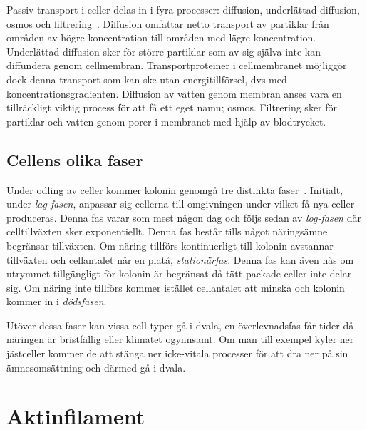 Passiv transport i celler delas in i fyra processer: diffusion, underlättad diffusion, osmos och filtrering~\cite{Cram_Passivetransport}. Diffusion omfattar netto transport av partiklar från områden av högre koncentration till områden med lägre koncentration. Underlättad diffusion sker för större partiklar som av sig själva inte kan diffundera genom cellmembran. Transportproteiner i cellmembranet möjliggör dock denna transport som kan ske utan energitillförsel, dvs med koncentrationsgradienten. Diffusion av vatten genom membran anses vara en tillräckligt viktig process för att få ett eget namn; osmos. Filtrering sker för partiklar och vatten genom porer i membranet med hjälp av blodtrycket.


\subsection{Cellens olika faser}

Under odling av celler kommer kolonin genomgå tre distinkta faser~\cite{Heidcamp_Cellfas}. Initialt, under \emph{lag-fasen}, anpassar sig cellerna till omgivningen under vilket få nya celler produceras. Denna fas varar som mest någon dag och följs sedan av \emph{log-fasen} där celltillväxten sker exponentiellt. Denna fas består tills något näringsämne begränsar tillväxten. Om näring tillförs kontinuerligt till kolonin avstannar tillväxten och cellantalet når en platå, \emph{stationärfas}. Denna fas kan även nås om utrymmet tillgängligt för kolonin är begränsat då tätt-packade celler inte delar sig. 
Om näring inte tillförs kommer istället cellantalet att minska och kolonin kommer in i \emph{dödsfasen}.

Utöver dessa faser kan vissa cell-typer gå i dvala, en överlevnadsfas får tider då näringen är bristfällig eller klimatet ogynnsamt. Om man till exempel kyler ner jästceller kommer de att stänga ner icke-vitala processer för att dra ner på sin ämnesomsättning och därmed gå i dvala.  


\section{Aktinfilament}

